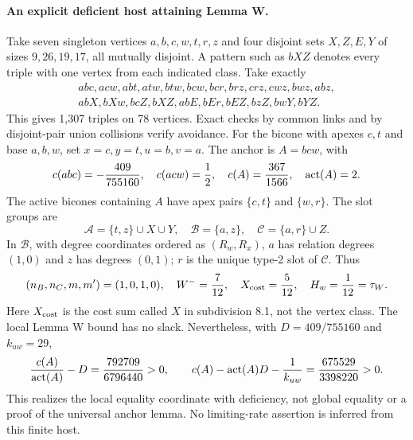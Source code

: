 \paragraph{An explicit deficient host attaining Lemma W.}
Take seven singleton vertices $a,b,c,w,t,r,z$ and four disjoint sets $X,Z,E,Y$ of sizes $9,26,19,17$, all mutually disjoint. A pattern such as $bXZ$ denotes every triple with one vertex from each indicated class. Take exactly
\[
\begin{gathered}
abc,acw,abt,atw,btw,bcw,bcr,brz,crz,cwz,bwz,abz,\\
abX,bXw,bcZ,bXZ,abE,bEr,bEZ,bzZ,bwY,bYZ.
\end{gathered}
\]
This gives 1,307 triples on 78 vertices. Exact checks by common links and by disjoint-pair union collisions verify avoidance. For the bicone with apexes $c,t$ and base $a,b,w$, set $x=c,y=t,u=b,v=a$. The anchor is $A=bcw$, with
\[
c(abc)=-\frac{409}{755160},\quad c(acw)=\frac12,\quad
c(A)=\frac{367}{1566},\quad\operatorname{act}(A)=2.
\]
The active bicones containing $A$ have apex pairs $\{c,t\}$ and $\{w,r\}$. The slot groups are
\[
\mathcal A=\{t,z\}\cup X\cup Y,\quad\mathcal B=\{a,z\},\quad
\mathcal C=\{a,r\}\cup Z.
\]
In $\mathcal B$, with degree coordinates ordered as $(R_w,R_x)$, $a$ has relation degrees $(1,0)$ and $z$ has degrees $(0,1)$; $r$ is the unique type-2 slot of $\mathcal C$. Thus
\[
(n_B,n_C,m,m')=(1,0,1,0),\quad W^-=\frac7{12},\quad
X_{\rm cost}=\frac5{12},\quad H_w=\frac1{12}=\tau_W.
\]
Here $X_{\rm cost}$ is the cost sum called $X$ in subdivision 8.1, not the vertex class. The local Lemma W bound has no slack. Nevertheless, with $D=409/755160$ and $k_{uw}=29$,
\[
\frac{c(A)}{\operatorname{act}(A)}-D=\frac{792709}{6796440}>0,\qquad
c(A)-\operatorname{act}(A)D-\frac1{k_{uw}}=\frac{675529}{3398220}>0.
\]
This realizes the local equality coordinate with deficiency, not global equality or a proof of the universal anchor lemma. No limiting-rate assertion is inferred from this finite host.
